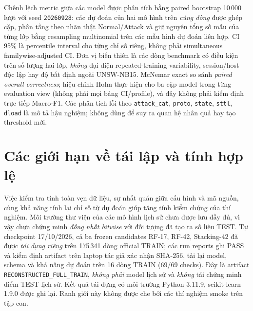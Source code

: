 Chênh lệch metric giữa các model được phân tích bằng paired bootstrap 10\,000 lượt với seed \texttt{20260928}: các dự đoán của hai mô hình trên \emph{cùng dòng} được ghép cặp, phân tầng theo nhãn thật Normal/Attack và giữ nguyên tổng số mẫu của từng lớp bằng resampling multinomial trên các mẫu hình dự đoán liên hợp. CI 95\% là percentile interval cho từng chỉ số riêng, không phải simultaneous familywise-adjusted CI. Đơn vị biến thiên là các dòng benchmark có điều kiện trên số lượng hai lớp, \emph{không} đại diện repeated-training variability, session/host độc lập hay độ bất định ngoài UNSW-NB15. McNemar exact so sánh \emph{paired overall correctness}; hiệu chỉnh Holm thực hiện cho ba cặp model trong từng evaluation view (không phải mọi bảng CI/profile), và đây không phải kiểm định trực tiếp Macro-F1. Các phân tích lỗi theo \texttt{attack\_cat}, \texttt{proto}, \texttt{state}, \texttt{sttl}, \texttt{dload} là mô tả hậu nghiệm; không dùng để suy ra quan hệ nhân quả hay tạo threshold mới.

\section{Các giới hạn về tái lập và tính hợp lệ}
Việc kiểm tra tính toàn vẹn dữ liệu, sự nhất quán giữa cấu hình và mã nguồn, cùng khả năng tính lại chỉ số từ dự đoán giúp tăng tính kiểm chứng của thí nghiệm. Môi trường thư viện của các mô hình lịch sử chưa được lưu đầy đủ, vì vậy chưa chứng minh \emph{đồng nhất bitwise} với đối tượng đã tạo ra số liệu TEST. Tại checkpoint 17/10/2026, cả ba frozen candidates RF-17, RF-42, Stacking-42 đã được \emph{tái dựng riêng} trên 175\,341 dòng official TRAIN; các run reports ghi PASS và kiểm định artifact trên laptop tác giả xác nhận SHA-256, tải lại model, schema và khả năng dự đoán trên 16 dòng TRAIN (69/69 checks). Đây là artifact \texttt{RECONSTRUCTED\_FULL\_TRAIN}, \emph{không phải} model lịch sử và \emph{không} tái chứng minh điểm TEST lịch sử. Kết quả tái dựng có môi trường Python 3.11.9, scikit-learn 1.9.0 được ghi lại. Ranh giới này không được che bởi các thí nghiệm smoke trên tập con.
